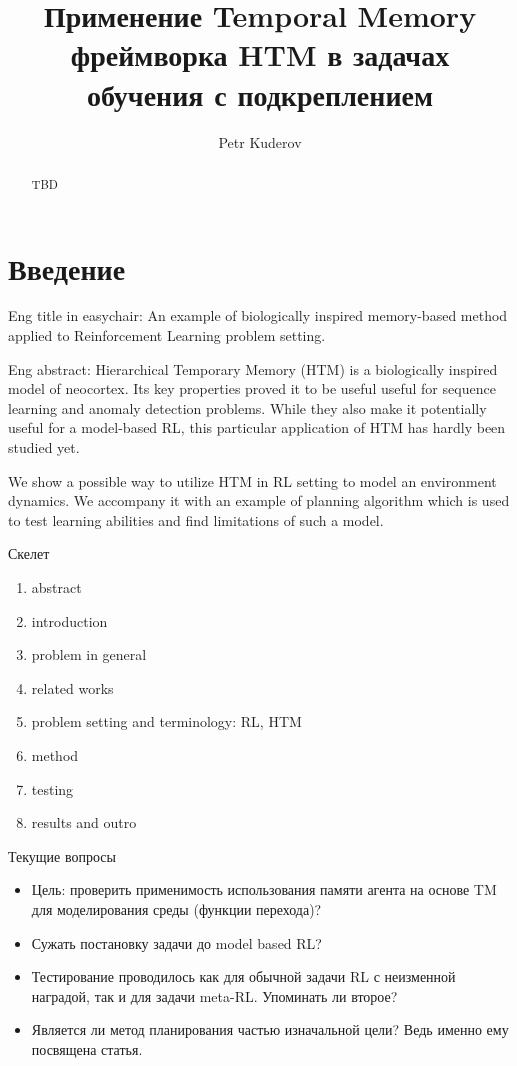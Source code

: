 \documentclass[a4paper]{article}
\begin{document}
\title {Применение Temporal Memory фреймворка HTM в задачах обучения с подкреплением}
\author {Petr Kuderov}
\maketitle

\begin{abstract}
  TBD
\end{abstract}

\section{Введение}

Eng title in easychair: An example of biologically inspired memory-based method applied to Reinforcement Learning problem setting.

Eng abstract:
Hierarchical Temporary Memory (HTM) is a biologically inspired model of neocortex. Its key properties proved it to be useful useful for sequence learning and anomaly detection problems. While they also make it potentially useful for a model-based RL, this particular application of HTM has hardly been studied yet.

We show a possible way to utilize HTM in RL setting to model an environment dynamics. We accompany it with an example of planning algorithm which is used to test learning abilities and find limitations of such a model.

Скелет
\begin{enumerate}
  \item abstract
  \item introduction
  \item problem in general
  \item related works
  \item problem setting and terminology: RL, HTM
  \item method
  \item testing
  \item results and outro
\end{enumerate}

Текущие вопросы
\begin{itemize}
  \item Цель: проверить применимость использования памяти агента на основе TM для моделирования среды (функции перехода)?
  \item Сужать постановку задачи до model based RL?
  \item Тестирование проводилось как для обычной задачи RL с неизменной наградой, так и для задачи meta-RL. Упоминать ли второе?
  \item Является ли метод планирования частью изначальной цели? Ведь именно ему посвящена статья.
\end{itemize}
\end{document}

